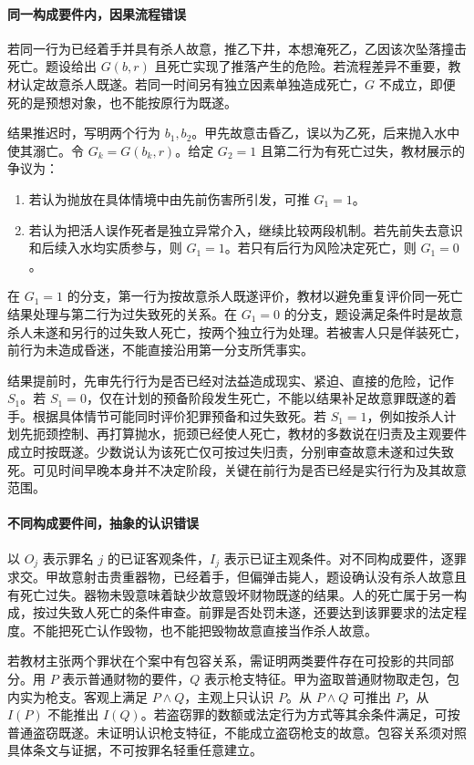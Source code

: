 \paragraph{同一构成要件内，因果流程错误}
若同一行为已经着手并具有杀人故意，推乙下井，本想淹死乙，乙因该次坠落撞击死亡。题设给出 $G(b,r)$ 且死亡实现了推落产生的危险。若流程差异不重要，教材认定故意杀人既遂。若同一时间另有独立因素单独造成死亡，$G$ 不成立，即便死的是预想对象，也不能按原行为既遂。

结果推迟时，写明两个行为 $b_1,b_2$。甲先故意击昏乙，误以为乙死，后来抛入水中使其溺亡。令 $G_k=G(b_k,r)$。给定 $G_2=1$ 且第二行为有死亡过失，教材展示的争议为：
\begin{enumerate}
\item 若认为抛放在具体情境中由先前伤害所引发，可推 $G_1=1$。
\item 若认为把活人误作死者是独立异常介入，继续比较两段机制。若先前失去意识和后续入水均实质参与，则 $G_1=1$。若只有后行为风险决定死亡，则 $G_1=0$。
\end{enumerate}
在 $G_1=1$ 的分支，第一行为按故意杀人既遂评价，教材以避免重复评价同一死亡结果处理与第二行为过失致死的关系。在 $G_1=0$ 的分支，题设满足条件时是故意杀人未遂和另行的过失致人死亡，按两个独立行为处理。若被害人只是佯装死亡，前行为未造成昏迷，不能直接沿用第一分支所凭事实。

结果提前时，先审先行行为是否已经对法益造成现实、紧迫、直接的危险，记作 $S_1$。若 $S_1=0$，仅在计划的预备阶段发生死亡，不能以结果补足故意罪既遂的着手。根据具体情节可能同时评价犯罪预备和过失致死。若 $S_1=1$，例如按杀人计划先扼颈控制、再打算抛水，扼颈已经使人死亡，教材的多数说在归责及主观要件成立时按既遂。少数说认为该死亡仅可按过失归责，分别审查故意未遂和过失致死。可见时间早晚本身并不决定阶段，关键在前行为是否已经是实行行为及其故意范围。

\paragraph{不同构成要件间，抽象的认识错误}
以 $O_j$ 表示罪名 $j$ 的已证客观条件，$I_j$ 表示已证主观条件。对不同构成要件，逐罪求交。甲故意射击贵重器物，已经着手，但偏弹击毙人，题设确认没有杀人故意且有死亡过失。器物未毁意味着缺少故意毁坏财物既遂的结果。人的死亡属于另一构成，按过失致人死亡的条件审查。前罪是否处罚未遂，还要达到该罪要求的法定程度。不能把死亡认作毁物，也不能把毁物故意直接当作杀人故意。

若教材主张两个罪状在个案中有包容关系，需证明两类要件存在可投影的共同部分。用 $P$ 表示普通财物的要件，$Q$ 表示枪支特征。甲为盗取普通财物取走包，包内实为枪支。客观上满足 $P\land Q$，主观上只认识 $P$。从 $P\land Q$ 可推出 $P$，从 $I(P)$ 不能推出 $I(Q)$。若盗窃罪的数额或法定行为方式等其余条件满足，可按普通盗窃既遂。未证明认识枪支特征，不能成立盗窃枪支的故意。包容关系须对照具体条文与证据，不可按罪名轻重任意建立。

